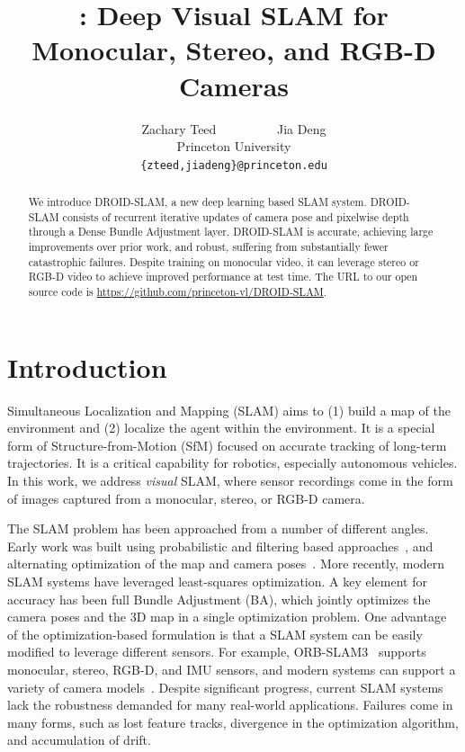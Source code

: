 \documentclass{article}
\title{\methodname{}: Deep Visual SLAM for Monocular, Stereo, and RGB-D Cameras}
\author{Zachary Teed \ \ \ \ \ \ \ \ \ Jia Deng \\
Princeton University \\
{\tt\small \{zteed,jiadeng\}@princeton.edu}}
\newcommand{\methodname}{DROID-SLAM}
\begin{document}
\maketitle

\begin{abstract}
We introduce \methodname{}, a new deep learning based SLAM system. \methodname{} consists of recurrent iterative updates of camera pose and pixelwise depth through a Dense Bundle Adjustment layer. \methodname{} is accurate, achieving large improvements over prior work, and robust, suffering from substantially fewer catastrophic failures. Despite training on monocular video, it can leverage stereo or RGB-D video to achieve improved performance at test time. The URL to our open source code is  \url{https://github.com/princeton-vl/DROID-SLAM}.
\end{abstract}

\section{Introduction}
Simultaneous Localization and Mapping (SLAM) aims to (1) build a map of the environment and (2) localize the agent within the environment. It is a special form of Structure-from-Motion (SfM) focused on accurate tracking of long-term trajectories.
It is a critical capability for robotics, especially autonomous vehicles. In this work, we address \emph{visual} SLAM, where sensor recordings come in the form of images captured from a monocular, stereo, or RGB-D camera.

The SLAM problem has been approached from a number of different angles. Early work was built using probabilistic and filtering based approaches~\cite{monoslam,ekfslam}, and alternating optimization of the map and camera poses~\cite{dtam,lsd}. More recently, modern SLAM systems have leveraged least-squares optimization. A key element for accuracy has been full Bundle Adjustment (BA), which jointly optimizes the camera poses and the 3D map in a single optimization problem. One advantage of the optimization-based formulation is that a SLAM system can be easily modified to leverage different sensors. For example, ORB-SLAM3~\cite{orbslam3} supports monocular, stereo, RGB-D, and IMU sensors, and modern systems can support a variety of camera models~\cite{orbslam3,omnidso,shutterdso,lsdomni}. Despite significant progress, current SLAM systems lack the robustness demanded for many real-world applications. Failures come in many forms, such as lost feature tracks, divergence in the optimization algorithm, and accumulation of drift.
\end{document}
